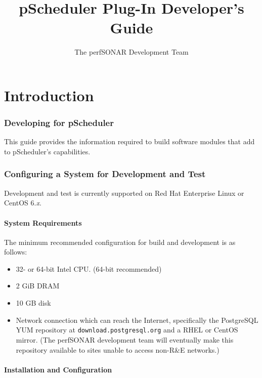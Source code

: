 \documentclass[10pt,titlepage]{article}
\title{pScheduler Plug-In Developer's Guide}
\author{The perfSONAR Development Team}
\begin{document}
\maketitle
\tableofcontents


\part{Introduction}

\section{Developing for pScheduler}

This guide provides the information required to build software modules
that add to pScheduler's capabilities.



\section{Configuring a System for Development and Test}

Development and test is currently supported on Red Hat Enterprise
Linux or CentOS 6.{\it x}.



\subsection{System Requirements}

The minimum recommended configuration for build and development is as
follows:

\begin{itemize}
\item 32- or 64-bit Intel CPU.  (64-bit recommended)
\item 2 GiB DRAM
\item 10 GB disk
\item Network connection which can reach the Internet, specifically
  the PostgreSQL YUM repository at {\tt download.postgresql.org} and a
  RHEL or CentOS mirror.  (The perfSONAR development team will
  eventually make this repository available to sites unable to access
  non-R\&E networks.)
\end{itemize}

\subsection{Installation and Configuration}
\end{document}
